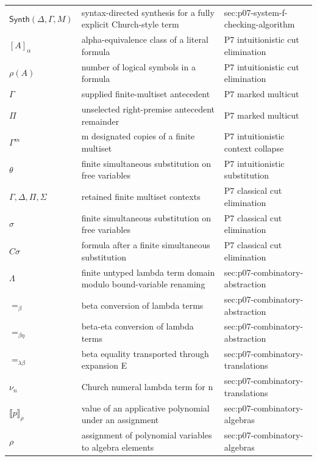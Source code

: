 \begin{longtable}{@{}p{}p{}p{}@{}}
\(\mathsf{Synth}(\Delta,\allowbreak \Gamma,\allowbreak M)\) & syntax-directed synthesis for a fully explicit Church-style term & sec:\allowbreak{}p07-\allowbreak{}system-\allowbreak{}f-\allowbreak{}checking-\allowbreak{}algorithm \\
\([A]_\alpha\) & alpha-equivalence class of a literal formula & P7 intuitionistic cut elimination \\
\(\rho(A)\) & number of logical symbols in a formula & P7 intuitionistic cut elimination \\
\(\Gamma\) & supplied finite-multiset antecedent & P7 marked multicut \\
\(\Pi\) & unselected right-premise antecedent remainder & P7 marked multicut \\
\(\Gamma^m\) & m designated copies of a finite multiset & P7 intuitionistic context collapse \\
\(\theta\) & finite simultaneous substitution on free variables & P7 intuitionistic substitution \\
\(\Gamma,\allowbreak \Delta,\allowbreak \Pi,\allowbreak \Sigma\) & retained finite multiset contexts & P7 classical cut elimination \\
\(\sigma\) & finite simultaneous substitution on free variables & P7 classical cut elimination \\
\(C\sigma\) & formula after a finite simultaneous substitution & P7 classical cut elimination \\
\(\Lambda\) & finite untyped lambda term domain modulo bound-variable renaming & sec:\allowbreak{}p07-\allowbreak{}combinatory-\allowbreak{}abstraction \\
\(=_\beta\) & beta conversion of lambda terms & sec:\allowbreak{}p07-\allowbreak{}combinatory-\allowbreak{}abstraction \\
\(=_{\beta\eta}\) & beta-eta conversion of lambda terms & sec:\allowbreak{}p07-\allowbreak{}combinatory-\allowbreak{}abstraction \\
\(=_{\lambda\beta}\) & beta equality transported through expansion E & sec:\allowbreak{}p07-\allowbreak{}combinatory-\allowbreak{}translations \\
\(\nu_n\) & Church numeral lambda term for n & sec:\allowbreak{}p07-\allowbreak{}combinatory-\allowbreak{}translations \\
\(\llbracket p\rrbracket_\rho\) & value of an applicative polynomial under an assignment & sec:\allowbreak{}p07-\allowbreak{}combinatory-\allowbreak{}algebras \\
\(\rho\) & assignment of polynomial variables to algebra elements & sec:\allowbreak{}p07-\allowbreak{}combinatory-\allowbreak{}algebras \\

\end{longtable}
